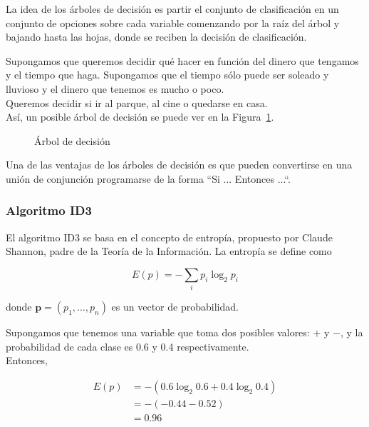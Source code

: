 La idea de los árboles de decisión es partir el conjunto de clasificación en un conjunto de opciones sobre cada variable comenzando por la raíz del árbol y bajando hasta las hojas, donde se reciben la decisión de clasificación. \\

\begin{ejemplo}
Supongamos que queremos decidir qué hacer en función del dinero que tengamos y el tiempo que haga. Supongamos que el tiempo sólo puede ser soleado y lluvioso y el dinero que tenemos es mucho o poco.\\

Queremos decidir si ir al parque, al cine o quedarse en casa.\\

Así, un posible árbol de decisión se puede ver en la Figura~\ref{fig:arboldecision}.

\begin{figure}[htbp!]
	\label{fig:arboldecision}
	\begin{center}
		\arboldedecision
	\end{center}
	\caption{Árbol de decisión}
\end{figure}
\end{ejemplo}

Una de las ventajas de los árboles de decisión es que pueden convertirse en una unión de conjunción programarse de la forma ``Si ... Entonces ...``.

\subsubsection{Algoritmo ID3}

El algoritmo ID3 se basa en el concepto de entropía, propuesto por Claude Shannon, padre de la Teoría de la Información. La entropía se define como

\begin{equation}
E(p) = -\sum_{i} p_i \log_2 p_i
\end{equation}

donde $\mathbf{p} = (p_1, \dots, p_n)$ es un vector de probabilidad.

\begin{ejemplo}
Supongamos que tenemos una variable que toma dos posibles valores: $+$ y $-$, y la probabilidad de cada clase es 0.6 y 0.4 respectivamente.\\

Entonces,

\begin{align}
E(p) & = - (0.6 \log_2 0.6 + 0.4 \log_2 0.4) \\
     & = -(-0.44 - 0.52)\\
     & = 0.96
\end{align}
\end{ejemplo}

